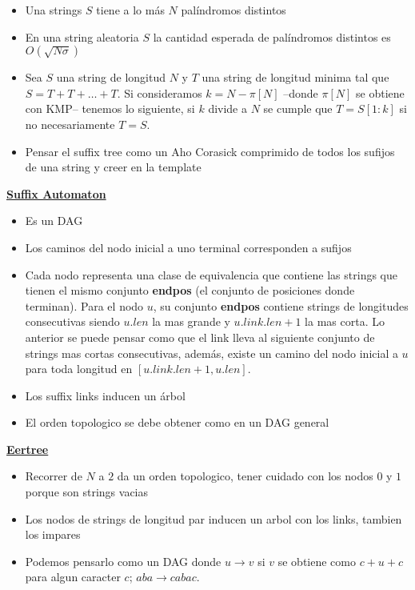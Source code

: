 \begin{itemize}
    \item Una strings $S$ tiene a lo más $N$ palíndromos distintos 
    \item En una string aleatoria $S$ la cantidad esperada de palíndromos distintos es $O(\sqrt{N \sigma})$
    \item Sea $S$ una string de longitud $N$ y $T$ una string de longitud minima tal que $S = T + T + \dots + T$. Si consideramos $k = N - \pi[N]$ --donde $\pi[N]$ se obtiene con KMP-- tenemos lo siguiente, si $k$ divide a $N$ se cumple que $T = S[1: k]$ si no necesariamente $T = S$.
    \item Pensar el suffix tree como un Aho Corasick comprimido de todos los sufijos de una string y creer en la template
\end{itemize}

\ul{\textbf{Suffix Automaton}}

\begin{itemize}
    \item  Es un DAG
    \item Los caminos del nodo inicial a uno terminal corresponden a sufijos
    \item Cada nodo representa una clase de equivalencia que contiene las strings que tienen el mismo conjunto \textbf{endpos} (el conjunto de posiciones donde terminan). Para el nodo $u$, su conjunto \textbf{endpos} contiene strings de longitudes consecutivas siendo $u.len$ la mas grande y $u.link.len + 1$ la mas corta. Lo anterior se puede pensar como que el link lleva al siguiente conjunto de strings mas cortas consecutivas, además, existe un camino del nodo inicial a $u$ para toda longitud en $[u.link.len + 1, u.len]$. 
    \item Los suffix links inducen un árbol 
    \item El orden topologico se debe obtener como en un DAG general
\end{itemize}

\ul{\textbf{Eertree}}

\begin{itemize}
    \item Recorrer de $N$ a $2$ da un orden topologico, tener cuidado con los nodos $0$ y $1$ porque son strings vacias
    \item Los nodos de strings de longitud par inducen un arbol con los links, tambien los impares
    \item Podemos pensarlo como un DAG donde $u \to v$ si $v$ se obtiene como $c + u + c$ para algun caracter $c$; $aba \to cabac$. 
\end{itemize}
